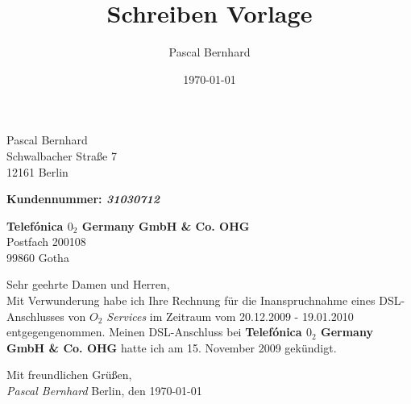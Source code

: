 \documentclass[a4paper,11pt]{letter}
\author{Pascal Bernhard}
\title{Schreiben Vorlage}
\date{\today}
\begin{document}
 
\pagestyle{empty}



	\begin{flushright}
	
		Pascal Bernhard\\
		Schwalbacher Stra{\ss}e 7\\
		12161 Berlin\linebreak
		
		\textbf{Kundennummer: \textsl{31030712}}
		
	\end{flushright}

\vspace{20mm}	

\textbf{Telef\'onica $0_{2}$ Germany GmbH \& Co. OHG}\\
Postfach 200108\\
99860 Gotha

\vspace{22mm}


Sehr geehrte Damen und Herren,\\

Mit Verwunderung habe ich Ihre Rechnung f\"ur die Inanspruchnahme eines DSL-Anschlusses von \textsl{$O_{2}$ Services} im Zeitraum vom 20.12.2009 - 19.01.2010 entgegengenommen. Meinen DSL-Anschluss bei \textbf{Telef\'onica $0_{2}$ Germany GmbH \& Co. OHG} hatte ich am 15. November 2009 gek\"undigt.\par
\vspace{12mm}	


Mit freundlichen Gr\"u{\ss}en,\\ 

\emph{Pascal Bernhard}\newline				
Berlin, den \today
\end{document}
